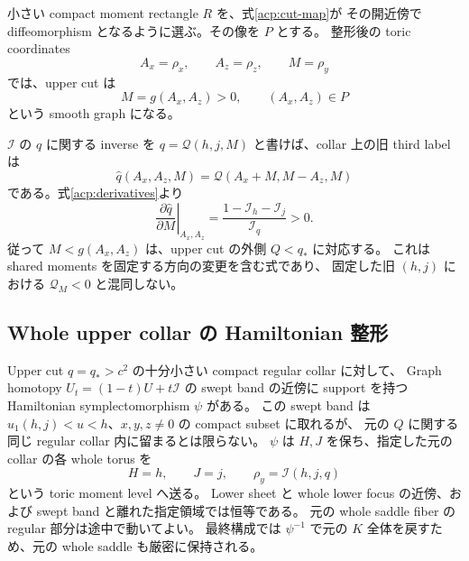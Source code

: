小さい compact moment rectangle $R$ を、式\eqref{acp:cut-map}が
その開近傍で diffeomorphism となるように選ぶ。その像を $P$ とする。
整形後の toric coordinates
\[
 A_x=\rho_x,\qquad A_z=\rho_z,\qquad M=\rho_y
\]
では、upper cut は
\begin{equation}\label{acp:g}
 M=g(A_x,A_z)>0,\qquad (A_x,A_z)\in P
\end{equation}
という smooth graph になる。

$\mathcal I$ の $q$ に関する inverse を
$q=\mathcal Q(h,j,M)$ と書けば、collar 上の旧 third label は
\[
 \widehat q(A_x,A_z,M)
 =\mathcal Q(A_x+M,M-A_z,M)
\]
である。式\eqref{acp:derivatives}より
\begin{equation}\label{acp:q-monotone}
 \left.\frac{\partial\widehat q}{\partial M}\right|_{A_x,A_z}
 =\frac{1-\mathcal I_h-\mathcal I_j}{\mathcal I_q}>0.
\end{equation}
従って $M<g(A_x,A_z)$ は、upper cut の外側 $Q<q_*$ に対応する。
これは shared moments を固定する方向の変更を含む式であり、
固定した旧 $(h,j)$ における $\mathcal Q_M<0$ と混同しない。

\subsection{Whole upper collar の Hamiltonian 整形}

\begin{lemma}\label{acp:straighten}
Upper cut $q=q_*>c^2$ の十分小さい compact regular collar に対して、
Graph homotopy $U_t=(1-t)U+t\mathcal I$ の swept band の近傍に
support を持つ Hamiltonian symplectomorphism $\psi$ がある。
この swept band は $u_1(h,j)<u<h$、$x,y,z\ne0$ の compact subset に取れるが、
元の $Q$ に関する同じ regular collar 内に留まるとは限らない。
$\psi$ は $H,J$ を保ち、指定した元の collar の各 whole torus を
\[
 H=h,\qquad J=j,\qquad \rho_y=\mathcal I(h,j,q)
\]
という toric moment level へ送る。
Lower sheet と whole lower focus の近傍、および swept band と離れた指定領域では恒等である。
元の whole saddle fiber の regular 部分は途中で動いてよい。
最終構成では $\psi^{-1}$ で元の $K$ 全体を戻すため、元の whole saddle も厳密に保持される。
\end{lemma}

